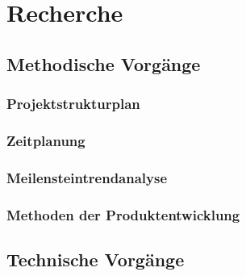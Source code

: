 \chapter{Recherche}

\section{Methodische Vorgänge}


\subsection{Projektstrukturplan}
\subsection{Zeitplanung}
\subsection{Meilensteintrendanalyse}
\subsection{Methoden der Produktentwicklung}

\section{Technische Vorgänge}